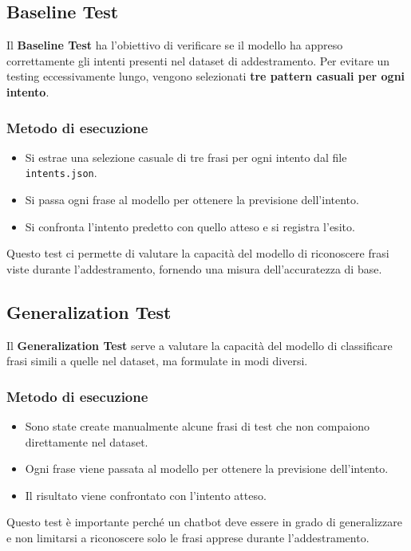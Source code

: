 \documentclass[12pt, letterpaper]{article}
\begin{document}
\subsection{Baseline Test}

Il \textbf{Baseline Test} ha l'obiettivo di verificare se il modello ha appreso correttamente gli intenti presenti nel dataset di addestramento. Per evitare un testing eccessivamente lungo, vengono selezionati \textbf{tre pattern casuali per ogni intento}.

\subsubsection{Metodo di esecuzione}
\begin{itemize}
	\item Si estrae una selezione casuale di tre frasi per ogni intento dal file \texttt{intents.json}.
	\item Si passa ogni frase al modello per ottenere la previsione dell'intento.
	\item Si confronta l'intento predetto con quello atteso e si registra l'esito.
\end{itemize}
Questo test ci permette di valutare la capacità del modello di riconoscere frasi viste durante l'addestramento, fornendo una misura dell'accuratezza di base.

\subsection{Generalization Test}

Il \textbf{Generalization Test} serve a valutare la capacità del modello di classificare frasi simili a quelle nel dataset, ma formulate in modi diversi.

\subsubsection{Metodo di esecuzione}
\begin{itemize}
	\item Sono state create manualmente alcune frasi di test che non compaiono direttamente nel dataset.
	\item Ogni frase viene passata al modello per ottenere la previsione dell'intento.
	\item Il risultato viene confrontato con l'intento atteso.
\end{itemize}
Questo test è importante perché un chatbot deve essere in grado di generalizzare e non limitarsi a riconoscere solo le frasi apprese durante l’addestramento.
\end{document}
